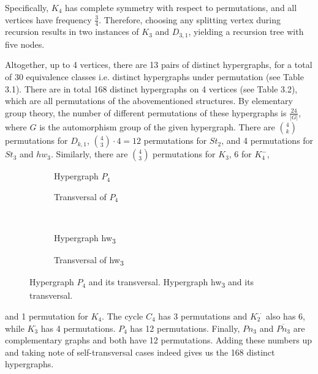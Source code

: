 Specifically, $K_4$ has complete symmetry with respect to permutations, and all vertices have frequency $\frac{3}{4}$. Therefore, choosing any splitting vertex during recursion results in two instances of $K_3$ and $D_{3,1}$, yielding a recursion tree with five nodes.

Altogether, up to 4 vertices, there are 13 pairs of distinct hypergraphs, for a total of 30 equivalence classes i.e. distinct hypergraphs under permutation (see Table 3.1). There are in total 168 distinct hypergraphs on 4 vertices (see Table 3.2), which are all permutations of the abovementioned structures. By elementary group theory, the number of different permutations of these hypergraphs is $\frac{24}{|G|}$, where $G$ is the automorphism group of the given hypergraph. There are $\binom{4}{k}$ permutations for $D_{k,1}$, $\binom{4}{3}\cdot 4=12$ permutations for $St_2$, and 4 permutations for $St_3$ and $hw_3$. Similarly, there are $\binom{4}{3}$ permutations for $K_3$, 6 for $K_4^-$,

\begin{figure}[tp]
\centering
\begin{subfigure}{0.45\linewidth}\centering\caption{Hypergraph $P_4$}\end{subfigure}\hfill
\begin{subfigure}{0.45\linewidth}\centering\caption{Transversal of $P_4$}\end{subfigure}\\[8pt]
\begin{subfigure}{0.45\linewidth}\centering\caption{Hypergraph hw\textsubscript{3}}\end{subfigure}\hfill
\begin{subfigure}{0.45\linewidth}\centering\caption{Transversal of hw\textsubscript{3}}\end{subfigure}
\caption{Hypergraph $P_4$ and its transversal. Hypergraph hw\textsubscript{3} and its transversal.}\label{fig:p4-hw3}
\end{figure}

\noindent and 1 permutation for $K_4$. The cycle $C_4$ has 3 permutations and $K_2^{\cdot\cdot}$ also has 6, while $K_3^{\cdot}$ has 4 permutations. $P_4$ has 12 permutations. Finally, $Pn_3$ and $\overline{Pn_3}$ are complementary graphs and both have 12 permutations. Adding these numbers up and taking note of self-transversal cases indeed gives us the 168 distinct hypergraphs.

